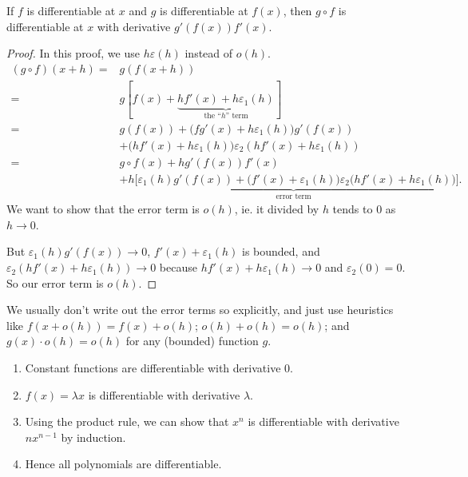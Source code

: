 \documentclass[a4paper]{article}
\begin{document}
\begin{lemma}
  If $f$ is differentiable at $x$ and $g$ is differentiable at $f(x)$, then $g\circ f$ is differentiable at $x$ with derivative $g'(f(x))f'(x)$.
\end{lemma}

\begin{proof}
  In this proof, we use $h\varepsilon(h)$ instead of $o(h)$.
  \begin{align*}
    (g\circ f)(x + h) ={}& g(f(x + h))\\
    ={}& g[f(x) + \underbrace{hf'(x) + h\varepsilon_1(h)}_{\text{the ``}h\text{'' term}}]\\
    ={}& g(f(x)) + \big(fg'(x) + h\varepsilon_1(h)\big)g'(f(x))\\
    &+ \big(hf'(x) + h\varepsilon_1(h)\big)\varepsilon_2(hf'(x) + h\varepsilon_1(h))\\
    ={}& g\circ f(x) + hg'(f(x))f'(x)\\
    &+ \underbrace{h\Big[\varepsilon_1(h)g'(f(x)) + \big(f'(x) + \varepsilon_1(h)\big)\varepsilon_2\big(hf'(x) + h\varepsilon_1(h)\big)\Big]}_{\text{error term}}.
  \end{align*}
  We want to show that the error term is $o(h)$, ie. it divided by $h$ tends to $0$ as $h\to 0$.

  But $\varepsilon_1(h)g'(f(x))\to 0$, $f'(x) + \varepsilon_1(h)$ is bounded, and $\varepsilon_2(hf'(x) + h\varepsilon_1(h))\to 0$ because $hf'(x) + h\varepsilon_1(h) \to 0$ and $\varepsilon_2(0) = 0$. So our error term is $o(h)$.
\end{proof}

We usually don't write out the error terms so explicitly, and just use heuristics like $f(x + o(h)) = f(x) + o(h)$; $o(h) + o(h) = o(h)$; and $g(x) \cdot o(h) = o(h)$ for any (bounded) function $g$.

\begin{eg}\leavevmode
  \begin{enumerate}
    \item Constant functions are differentiable with derivative $0$.
    \item $f(x) = \lambda x$ is differentiable with derivative $\lambda$.
    \item Using the product rule, we can show that $x^n$ is differentiable with derivative $nx^{n - 1}$ by induction.
    \item Hence all polynomials are differentiable.
  \end{enumerate}
\end{eg}
\end{document}
